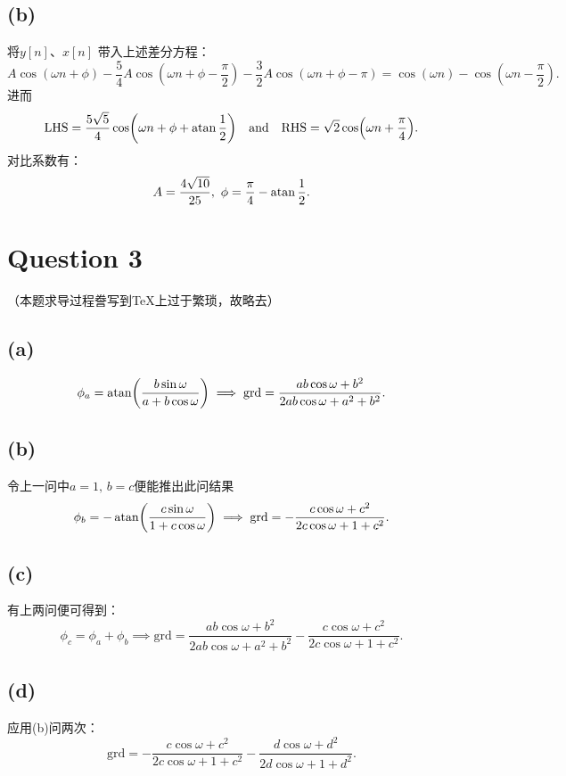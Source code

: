 \documentclass{article}
\begin{document}
\subsection*{(b)}
将$y[n]$、$x[n]$ 带入上述差分方程：
\[
    A\cos(\omega n+\phi)
	-
	\frac{5}{4}A\cos(\omega n+\phi-\frac{\pi}{2})
	-
	\frac{3}{2}A\cos(\omega n+\phi-\pi)
	=
	\cos(\omega n)
	-
	\cos(\omega n-\frac{\pi}{2})
.\] 
进而
\[
	\LHS=\frac{5\sqrt{5}}{4}\cos(\omega n+\phi+\atan\frac{1}{2})
	\qand
	\RHS=\sqrt{2}\cos(\omega n+\frac{\pi}{4})
.\]
对比系数有：
\[
	A=\frac{4\sqrt{10}}{25},\ \phi=\frac{\pi}{4}-\atan\frac{1}{2}
.\] 
\section*{Question 3}
（本题求导过程誊写到TeX上过于繁琐，故略去）
\subsection*{(a)}
\[
	\phi_a=\atan(\frac{b\sin\omega}{a+b\cos\omega})
	\implies
	\mathrm{grd}=\frac{ab\cos\omega+b^2}{2ab\cos\omega+a^2+b^2}
.\] 
\subsection*{(b)}
令上一问中$a=1,\,b=c$便能推出此问结果
\[
	\phi_b=-\atan(\frac{c\sin\omega}{1+c\cos\omega})
	\implies
	\mathrm{grd}=-\frac{c\cos\omega+c^2}{2c\cos\omega+1+c^2}
.\] 

\subsection*{(c)}
有上两问便可得到：
\[
	\phi_c=\phi_a+\phi_b
	\implies
	\mathrm{grd}=\frac{ab\cos\omega+b^2}{2ab\cos\omega+a^2+b^2}-\frac{c\cos\omega+c^2}{2c\cos\omega+1+c^2}
.\] 
\subsection*{(d)}
应用(b)问两次：
\[
	\mathrm{grd}=-\frac{c\cos\omega+c^2}{2c\cos\omega+1+c^2}-\frac{d\cos\omega+d^2}{2d\cos\omega+1+d^2}
.\] 
\end{document}
